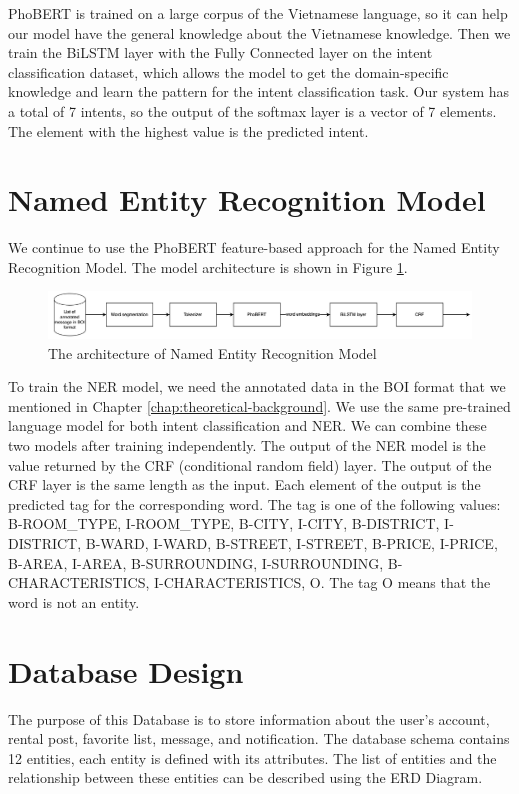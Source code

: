 PhoBERT is trained on a large corpus of the Vietnamese language, so it can help our model have the general knowledge about the Vietnamese knowledge. Then we train the BiLSTM layer with the Fully Connected layer on the intent classification dataset, which allows the model to get the domain-specific knowledge and learn the pattern for the intent classification task. Our system has a total of 7 intents, so the output of the softmax layer is a vector of 7 elements. The element with the highest value is the predicted intent. 

\section{Named Entity Recognition Model}
We continue to use the PhoBERT feature-based approach for the Named Entity Recognition Model. The model architecture is shown in Figure \ref{fig:ner-model}.

\begin{figure}[ht]
    \centering
    \includegraphics[width=\textwidth]{Images/7.System_Modeling/ner_architecture.png}
    \caption{The architecture of Named Entity Recognition Model}
    \label{fig:ner-model}
\end{figure}

To train the NER model, we need the annotated data in the BOI format that we mentioned in Chapter \ref{chap:theoretical-background}. We use the same pre-trained language model for both intent classification and NER. We can combine these two models after training independently. The output of the NER model is the value returned by the CRF (conditional random field) layer. The output of the CRF layer is the same length as the input. Each element of the output is the predicted tag for the corresponding word. The tag is one of the following values: B-ROOM\_TYPE, I-ROOM\_TYPE, B-CITY, I-CITY, B-DISTRICT, I-DISTRICT, B-WARD, I-WARD, B-STREET, I-STREET, B-PRICE, I-PRICE, B-AREA, I-AREA, B-SURROUNDING, I-SURROUNDING, B-CHARACTERISTICS, I-CHARACTERISTICS, O. The tag O means that the word is not an entity. 

\newpage
\section{Database Design}
The purpose of this Database is to store information about the user's account, rental post, favorite list, message, and notification. The database schema contains 12 entities, each entity is defined with its attributes. The list of entities and the relationship between these entities can be described using the ERD Diagram. 
